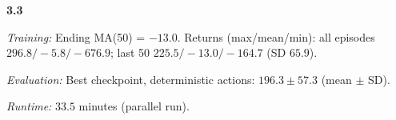 \noindent\textbf{3.3}\par
\emph{Training:} Ending MA(50) = $-13.0$. Returns (max/mean/min): all episodes $296.8/-5.8/-676.9$; last 50 $225.5/-13.0/-164.7$ (SD $65.9$).\par
\emph{Evaluation:} Best checkpoint, deterministic actions: $196.3\pm 57.3$ (mean $\pm$ SD).\par
\emph{Runtime:} $33.5$ minutes (parallel run).\par
